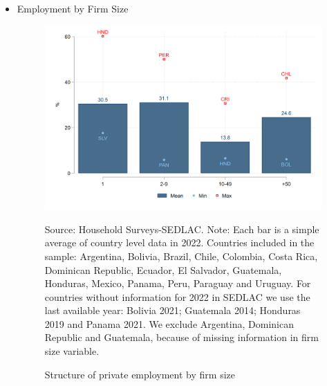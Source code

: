 \documentclass[english]{article}
\begin{document}
\begin{itemize}
            
        \item Employment by Firm Size
            \begin{figure}[H]
                    \justifying
                    \caption{Structure of private employment by firm size}     
                    \centerline{\includegraphics[scale=.3]{latex/figures/Snapshot/Structure of employment by firm size.png}
                    \label{fig:firmsize}}
                    \footnotesize{Source: Household Surveys-SEDLAC.}
                    \footnotesize{Note: Each bar is a simple average of country level data in 2022. Countries included in the sample: Argentina, Bolivia, Brazil, Chile, Colombia, Costa Rica, Dominican Republic, Ecuador, El Salvador, Guatemala, Honduras, Mexico, Panama, Peru, Paraguay and Uruguay. For countries without information for 2022 in SEDLAC we use the last available year: Bolivia 2021; Guatemala 2014; Honduras 2019 and Panama 2021. We exclude Argentina, Dominican Republic and Guatemala, because of missing information in firm size variable.}
            \end{figure}
    
    
            

\end{itemize}
\end{document}
